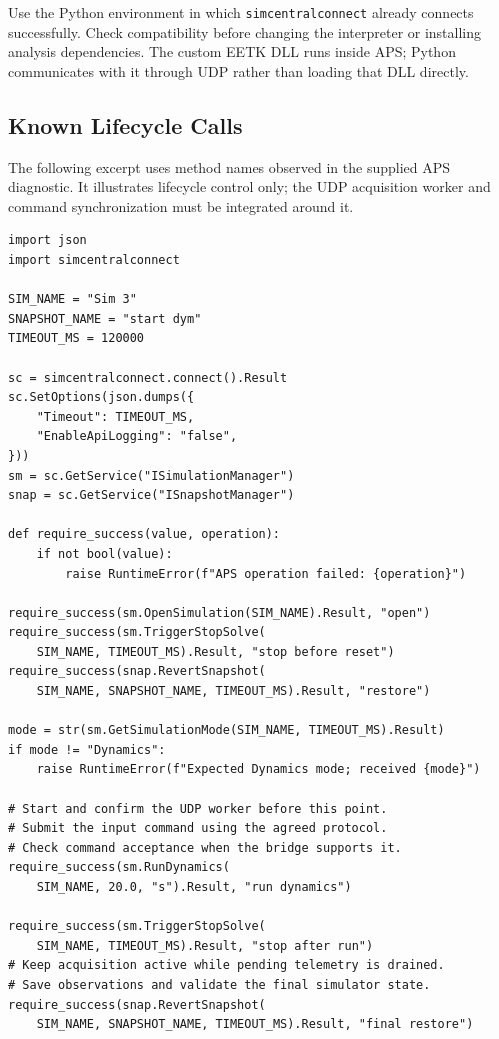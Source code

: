 \documentclass[11pt, letterpaper]{article}
\begin{document}
Use the Python environment in which \texttt{simcentralconnect} already connects successfully. Check compatibility before changing the interpreter or installing analysis dependencies. The custom EETK DLL runs inside APS; Python communicates with it through UDP rather than loading that DLL directly.

\subsection{Known Lifecycle Calls}
The following excerpt uses method names observed in the supplied APS diagnostic. It illustrates lifecycle control only; the UDP acquisition worker and command synchronization must be integrated around it.

\begin{lstlisting}[style=pythonstyle,caption={Lifecycle excerpt based on the demonstrated APS interface}]
import json
import simcentralconnect

SIM_NAME = "Sim 3"
SNAPSHOT_NAME = "start dym"
TIMEOUT_MS = 120000

sc = simcentralconnect.connect().Result
sc.SetOptions(json.dumps({
    "Timeout": TIMEOUT_MS,
    "EnableApiLogging": "false",
}))
sm = sc.GetService("ISimulationManager")
snap = sc.GetService("ISnapshotManager")

def require_success(value, operation):
    if not bool(value):
        raise RuntimeError(f"APS operation failed: {operation}")

require_success(sm.OpenSimulation(SIM_NAME).Result, "open")
require_success(sm.TriggerStopSolve(
    SIM_NAME, TIMEOUT_MS).Result, "stop before reset")
require_success(snap.RevertSnapshot(
    SIM_NAME, SNAPSHOT_NAME, TIMEOUT_MS).Result, "restore")

mode = str(sm.GetSimulationMode(SIM_NAME, TIMEOUT_MS).Result)
if mode != "Dynamics":
    raise RuntimeError(f"Expected Dynamics mode; received {mode}")

# Start and confirm the UDP worker before this point.
# Submit the input command using the agreed protocol.
# Check command acceptance when the bridge supports it.
require_success(sm.RunDynamics(
    SIM_NAME, 20.0, "s").Result, "run dynamics")

require_success(sm.TriggerStopSolve(
    SIM_NAME, TIMEOUT_MS).Result, "stop after run")
# Keep acquisition active while pending telemetry is drained.
# Save observations and validate the final simulator state.
require_success(snap.RevertSnapshot(
    SIM_NAME, SNAPSHOT_NAME, TIMEOUT_MS).Result, "final restore")
\end{lstlisting}
\end{document}

